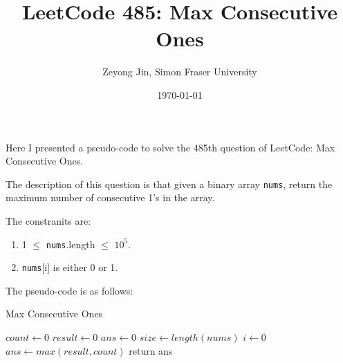 \documentclass{article}
\title{LeetCode 485: Max Consecutive Ones}
\author{Zeyong Jin, Simon Fraser University}
\date{\today}
\begin{document}
\maketitle

Here I presented a pseudo-code to solve the 485th question of LeetCode: Max Consecutive Ones.

The description of this question is that given a binary array \texttt{nums}, return the maximum number of consecutive 1's in the array.

The constranits are:
\begin{enumerate}
   \item 1 $\leq$ \texttt{nums}.length $\leq$ $10^{5}$.
   \item \texttt{nums}[i] is either 0 or 1.
\end{enumerate}


The pseudo-code is as follows:

{}

\begin{algorithm}[hbt!]
\caption{Max Consecutive Ones}\label{alg:two}
\LinesNumbered
{}
$count \gets 0$\;
$result \gets 0$\;
$ans \gets 0$\;
$size \gets length(nums)$\;
  {
  $i \gets 0$\;
$ans \gets max(result, count)$\;
return ans\;
  }

\end{algorithm}
\end{document}
